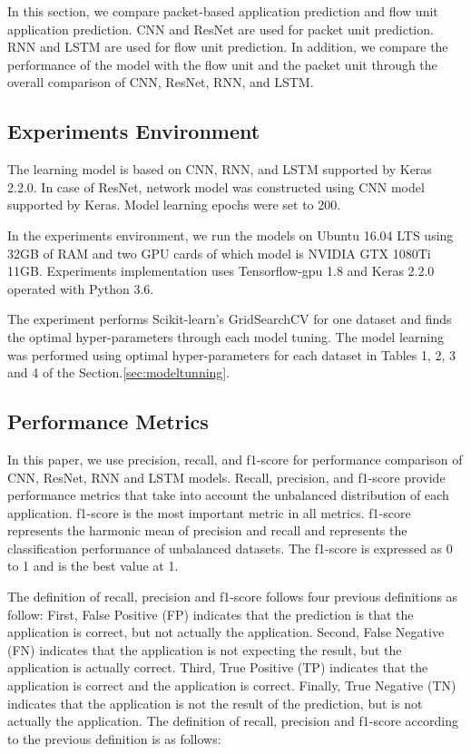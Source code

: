 In this section, we compare packet-based application prediction and flow unit application prediction.
CNN and ResNet are used for packet unit prediction.
RNN and LSTM are used for flow unit prediction.
In addition, we compare the performance of the model with the flow unit and the packet unit through the overall comparison of CNN, ResNet, RNN, and LSTM.

\subsection{Experiments Environment}
The learning model is based on CNN, RNN, and LSTM supported by Keras 2.2.0.
In case of ResNet, network model was constructed using CNN model supported by Keras.
Model learning epochs were set to 200.

In the experiments environment, we run the models on Ubuntu 16.04 LTS using 32GB of RAM and two GPU cards of which model is NVIDIA GTX 1080Ti 11GB.
Experiments implementation uses Tensorflow-gpu 1.8 and Keras 2.2.0 operated with Python 3.6.

The experiment performs Scikit-learn's GridSearchCV for one dataset and finds the optimal hyper-parameters through each model tuning.
The model learning was performed using optimal hyper-parameters for each dataset in Tables 1, 2, 3 and 4 of the Section.\ref{sec:modeltunning}.

\subsection{Performance Metrics}
In this paper, we use precision, recall, and f1-score \cite{citeulike:12882259} for performance comparison of CNN, ResNet, RNN and LSTM models.
Recall, precision, and f1-score provide performance metrics that take into account the unbalanced distribution of each application.
f1-score is the most important metric in all metrics.
f1-score represents the harmonic mean of precision and recall and represents the classification performance of unbalanced datasets.
The f1-score is expressed as 0 to 1 and is the best value at 1.

The definition of recall, precision and f1-score follows four previous definitions as follow:
First, False Positive (FP) indicates that the prediction is that the application is correct, but not actually the application.
Second, False Negative (FN) indicates that the application is not expecting the result, but the application is actually correct.
Third, True Positive (TP) indicates that the application is correct and the application is correct.
Finally, True Negative (TN) indicates that the application is not the result of the prediction, but is not actually the application.
The definition of recall, precision and f1-score according to the previous definition is as follows:


